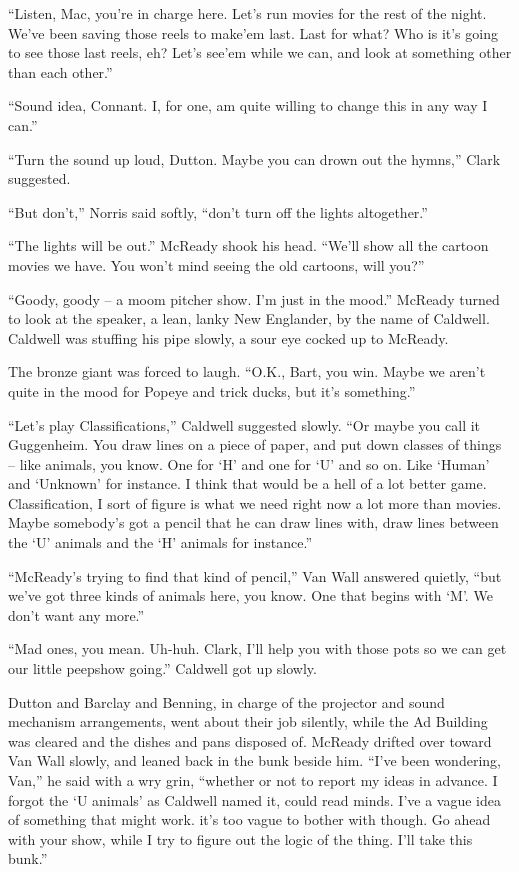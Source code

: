 \documentclass[ebook,oneside,11pt]{memoir}				%
\begin{document}
``Listen, Mac, you're in charge here. Let's run movies for the rest of the night. We've been saving those reels to make'em last. Last for what? Who is it's going to see those last reels, eh? Let's see'em while we can, and look at something other than each other.''

``Sound idea, Connant. I, for one, am quite willing to change this in any way I can.''

``Turn the sound up loud, Dutton. Maybe you can drown out the hymns,'' Clark suggested.

``But don't,'' Norris said softly, ``don't turn off the lights altogether.''

``The lights will be out.'' McReady shook his head. ``We'll show all the cartoon movies we have. You won't mind seeing the old cartoons, will you?''

``Goody, goody -- a moom pitcher show. I'm just in the mood.'' McReady turned to look at the speaker, a lean, lanky New Englander, by the name of Caldwell. Caldwell was stuffing his pipe slowly, a sour eye cocked up to McReady.

The bronze giant was forced to laugh. ``O.K., Bart, you win. Maybe we aren't quite in the mood for Popeye and trick ducks, but it's something.''

``Let's play Classifications,'' Caldwell suggested slowly. ``Or maybe you call it Guggenheim. You draw lines on a piece of paper, and put down classes of things -- like animals, you know. One for `H' and one for `U' and so on. Like `Human' and `Unknown' for instance. I think that would be a hell of a lot better game. Classification, I sort of figure is what we need right now a lot more than movies. Maybe somebody's got a pencil that he can draw lines with, draw lines between the `U' animals and the `H' animals for instance.''

``McReady's trying to find that kind of pencil,'' Van Wall answered quietly, ``but we've got three kinds of animals here, you know. One that begins with `M'. We don't want any more.''

``Mad ones, you mean. Uh-huh. Clark, I'll help you with those pots so we can get our little peepshow going.'' Caldwell got up slowly.

Dutton and Barclay and Benning, in charge of the projector and sound mechanism arrangements, went about their job silently, while the Ad Building was cleared and the dishes and pans disposed of. McReady drifted over toward Van Wall slowly, and leaned back in the bunk beside him. ``I've been wondering, Van,'' he said with a wry grin, ``whether or not to report my ideas in advance. I forgot the `U animals' as Caldwell named it, could read minds. I've a vague idea of something that might work. it's too vague to bother with though. Go ahead with your show, while I try to figure out the logic of the thing. I'll take this bunk.''
\end{document}
